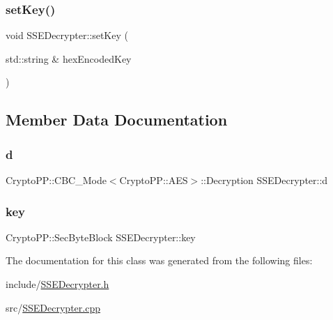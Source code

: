 \mbox{\label{classSSEDecrypter_a86d8cc2754814cfe59ee69ddf900b1f4}} 
\subsubsection{\texorpdfstring{set\+Key()}{setKey()}\hspace{0.1cm}{\footnotesize\ttfamily [2/2]}}
{\footnotesize\ttfamily void S\+S\+E\+Decrypter\+::set\+Key (\begin{DoxyParamCaption}\item[{std\+::string \&}]{hex\+Encoded\+Key }\end{DoxyParamCaption})}



\subsection{Member Data Documentation}
\mbox{\label{classSSEDecrypter_a339c0a434bd2a434b548d9d9e6d6762c}} 
\subsubsection{\texorpdfstring{d}{d}}
{\footnotesize\ttfamily Crypto\+P\+P\+::\+C\+B\+C\+\_\+\+Mode$<$Crypto\+P\+P\+::\+A\+ES$>$\+::Decryption S\+S\+E\+Decrypter\+::d\hspace{0.3cm}{\ttfamily [private]}}

\mbox{\label{classSSEDecrypter_a05c8a6317f2de2cfd37c5474d616d16a}} 
\subsubsection{\texorpdfstring{key}{key}}
{\footnotesize\ttfamily Crypto\+P\+P\+::\+Sec\+Byte\+Block S\+S\+E\+Decrypter\+::key\hspace{0.3cm}{\ttfamily [private]}}



The documentation for this class was generated from the following files\+:\begin{DoxyCompactItemize}
\item 
include/\hyperlink{SSEDecrypter_8h}{S\+S\+E\+Decrypter.\+h}\item 
src/\hyperlink{SSEDecrypter_8cpp}{S\+S\+E\+Decrypter.\+cpp}\end{DoxyCompactItemize}
